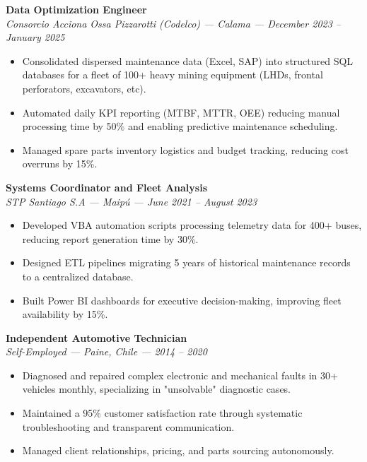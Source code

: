 \documentclass[10pt,letterpaper]{article}
\begin{document}
\vspace{0.2cm}

\noindent \textbf{Data Optimization Engineer} \\
\textit{Consorcio Acciona Ossa Pizzarotti (Codelco) — Calama — December 2023 – January 2025}
\begin{itemize}
    \item Consolidated dispersed maintenance data (Excel, SAP) into structured SQL databases for a fleet of 100+ heavy mining equipment (LHDs, frontal perforators, excavators, etc).
    \item Automated daily KPI reporting (MTBF, MTTR, OEE) reducing manual processing time by 50\% and enabling predictive maintenance scheduling.
    \item Managed spare parts inventory logistics and budget tracking, reducing cost overruns by 15\%.
\end{itemize}

\vspace{0.2cm}

\noindent \textbf{Systems Coordinator and Fleet Analysis} \\
\textit{STP Santiago S.A — Maipú — June 2021 – August 2023}
\begin{itemize}
    \item Developed VBA automation scripts processing telemetry data for 400+ buses, reducing report generation time by 30\%.
    \item Designed ETL pipelines migrating 5 years of historical maintenance records to a centralized database.
    \item Built Power BI dashboards for executive decision-making, improving fleet availability by 15\%.
\end{itemize}

\vspace{0.2cm}

\noindent \textbf{Independent Automotive Technician} \\
\textit{Self-Employed — Paine, Chile — 2014 – 2020}
\begin{itemize}
    \item Diagnosed and repaired complex electronic and mechanical faults in 30+ vehicles monthly, specializing in "unsolvable" diagnostic cases.
    \item Maintained a 95\% customer satisfaction rate through systematic troubleshooting and transparent communication.
    \item Managed client relationships, pricing, and parts sourcing autonomously.
\end{itemize}
\end{document}
